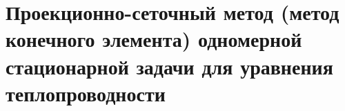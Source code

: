 \documentclass[__main__.tex]{subfiles}
\begin{document}
\section{Проекционно-сеточный метод (метод конечного элемента) одномерной стационарной задачи для уравнения теплопроводности}
\end{document}
